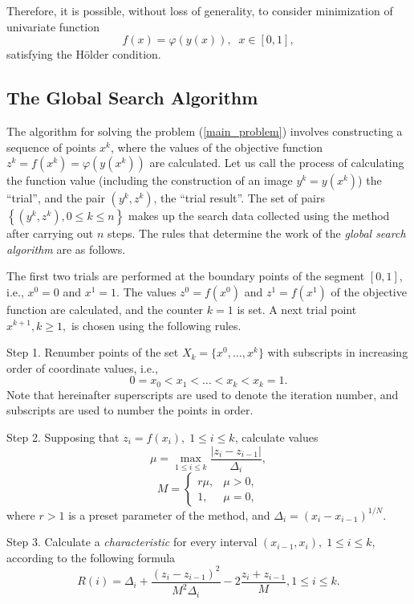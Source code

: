 \documentclass[sensors,article,submit,moreauthors,pdftex]{Definitions/mdpi}
\begin{document}
Therefore, it is possible, without loss of generality, to consider minimization of univariate function
\[
f(x)=\varphi(y(x)), \;\; x\in[0,1],
\]
satisfying the H{\"o}lder condition.


\subsection{The Global Search Algorithm}\label{GSA}

The algorithm for solving the problem (\ref{main_problem}) involves constructing a sequence of points $x^k$, where the values of the objective function $z^k = f(x^k)=\varphi(y(x^k))$ are calculated. Let us call the process of calculating the function value (including the construction of an image $y^k=y(x^k)$) the ``trial'', and the pair $(y^k, z^k)$, the ``trial result''. The set of pairs $\left\{(y^k, z^k), 0\leq k\leq n\right\}$ makes up the search data collected using the method after carrying out $n$ steps. The rules that determine the work of the \textit{global search algorithm} are as follows.

The first two trials are performed at the boundary points of the segment $[0,1]$, i.e., $x^0 = 0$ and $x^1 = 1$. The values $z^0 = f(x^0)$ and $z^1 = f(x^1)$ of the objective function are calculated, and the counter $k = 1$ is set. A next trial point $x^{k+1}, k \geq 1,$ is chosen using the following rules.

Step 1. Renumber points of the set $X_k=\{x^0,\dots,x^k\} $ with subscripts in increasing order of coordinate values, i.e.,
\[
0=x_0<x_1<\dots <x_k<x_{k}=1.
\]
Note that hereinafter superscripts are used to denote the iteration number, and subscripts are used to number the points in order.

Step 2. Supposing that  $z_i=f(x_i), \; 1\leq i \leq k$, calculate values 
\begin{equation}\label{mu}
\mu = \max_{1\leq i \leq k}\frac{\left|z_i-z_{i-1}\right|}{\Delta_i},
\end{equation}
\[
M = \left\{
   \begin{array}{lr}
     r\mu, & \mu > 0,\\
     1, & \mu = 0,
   \end{array}
\right.
 \]
where $r>1$ is a preset parameter of the method, and $\Delta_i=\left(x_i-x_{i-1}\right)^{1/N}$.

Step 3. Calculate a \textit{characteristic} for every interval $(x_{i-1}, x_i), \; 1\leq i \leq k,$   according to the following formula
\begin{equation}\label{R}
R(i)=\Delta_i+\frac{(z_i-z_{i-1})^2}{M^2\Delta_i}-2\frac{z_i+z_{i-1}}{M},1 \leq i \leq k.
\end{equation}
\end{document}
